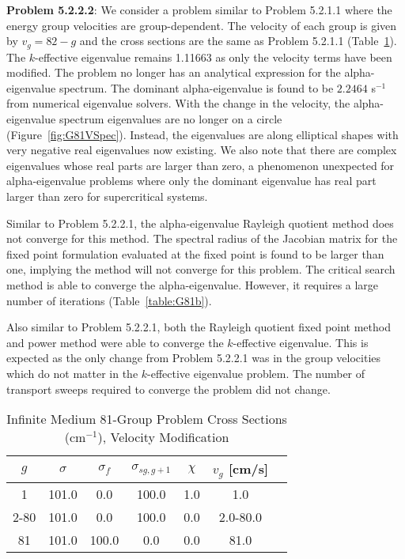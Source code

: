 \textbf{Problem 5.2.2.2}: We consider a problem similar to Problem 5.2.1.1 where the energy group velocities are group-dependent. The velocity of each group is given by $v_{g} = 82 - g$ and the cross sections are the same as Problem 5.2.1.1 (Table~\ref{table:G81v}). The $k$-effective eigenvalue remains 1.11663 as only the velocity terms have been modified. The problem no longer has an analytical expression for the alpha-eigenvalue spectrum. The dominant alpha-eigenvalue is found to be $2.2464$ s$^{-1}$ from numerical eigenvalue solvers. With the change in the velocity, the alpha-eigenvalue spectrum eigenvalues are no longer on a circle (Figure~\ref{fig:G81VSpec}). Instead, the eigenvalues are along elliptical shapes with very negative real eigenvalues now existing. We also note that there are complex eigenvalues whose real parts are larger than zero, a phenomenon unexpected for alpha-eigenvalue problems where only the dominant eigenvalue has real part larger than zero for supercritical systems.

Similar to Problem 5.2.2.1, the alpha-eigenvalue Rayleigh quotient method does not converge for this method. The spectral radius of the Jacobian matrix for the fixed point formulation evaluated at the fixed point is found to be larger than one, implying the method will not converge for this problem. The critical search method is able to converge the alpha-eigenvalue. However, it requires a large number of iterations (Table~\ref{table:G81b}).

Also similar to Problem 5.2.2.1, both the Rayleigh quotient fixed point method and power method were able to converge the $k$-effective eigenvalue. This is expected as the only change from Problem 5.2.2.1 was in the group velocities which do not matter in the $k$-effective eigenvalue problem. The number of transport sweeps required to converge the problem did not change.

\begin{table}[]
    \centering
    \caption{Infinite Medium 81-Group Problem Cross Sections (cm$^{-1}$), Velocity Modification}
\label{table:G81v}
    \begin{tabular}{*7c}
        \toprule
	$g$ & $\sigma$ & $\sigma_{f}$ & $\sigma_{sg,g+1}$ & $\chi$ & $v_{g}$ [cm/s] \\ 
        \midrule
	1 & 101.0 & 0.0 & 100.0 & 1.0 & 1.0 \\
	2-80 & 101.0 & 0.0 & 100.0 & 0.0 & 2.0-80.0 \\
	81 & 101.0 & 100.0 & 0.0 & 0.0 & 81.0 \\
        \bottomrule
    \end{tabular}
\end{table}

